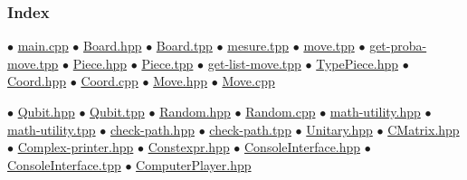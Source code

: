 
\begin{frame}
\frametitle{{Index}}
$\bullet$ \hyperlink{main.cpp}{main.cpp}\newline
$\bullet$ \hyperlink{Board.hpp}{Board.hpp}\newline
$\bullet$ \hyperlink{Board.tpp}{Board.tpp}\newline
$\bullet$ \hyperlink{mesure.tpp}{mesure.tpp}\newline
$\bullet$ \hyperlink{move.tpp}{move.tpp}\newline
$\bullet$ \hyperlink{getprobamove.tpp}{get-proba-move.tpp}\newline
$\bullet$ \hyperlink{Piece.hpp}{Piece.hpp}\newline
$\bullet$ \hyperlink{Piece.tpp}{Piece.tpp}\newline
$\bullet$ \hyperlink{getlistmove.tpp}{get-list-move.tpp}\newline
$\bullet$ \hyperlink{TypePiece.hpp}{TypePiece.hpp}\newline
$\bullet$ \hyperlink{Coord.hpp}{Coord.hpp}\newline
$\bullet$ \hyperlink{Coord.cpp}{Coord.cpp}\newline
$\bullet$ \hyperlink{Move.hpp}{Move.hpp}\newline
$\bullet$ \hyperlink{Move.cpp}{Move.cpp}\newline

\end{frame}
\begin{frame}
$\bullet$ \hyperlink{Qubit.hpp}{Qubit.hpp}\newline
$\bullet$ \hyperlink{Qubit.tpp}{Qubit.tpp}\newline
$\bullet$ \hyperlink{Random.hpp}{Random.hpp}\newline
$\bullet$ \hyperlink{Random.cpp}{Random.cpp}\newline
$\bullet$ \hyperlink{mathutility.hpp}{math-utility.hpp}\newline
$\bullet$ \hyperlink{mathutility.tpp}{math-utility.tpp}\newline
$\bullet$ \hyperlink{checkpath.hpp}{check-path.hpp}\newline
$\bullet$ \hyperlink{checkpath.tpp}{check-path.tpp}\newline
$\bullet$ \hyperlink{Unitary.hpp}{Unitary.hpp}\newline
$\bullet$ \hyperlink{CMatrix.hpp}{CMatrix.hpp}\newline
$\bullet$ \hyperlink{Complexprinter.hpp}{Complex-printer.hpp}\newline
$\bullet$ \hyperlink{Constexpr.hpp}{Constexpr.hpp}\newline
$\bullet$ \hyperlink{ConsoleInterface.hpp}{ConsoleInterface.hpp}\newline
$\bullet$ \hyperlink{ConsoleInterface.tpp}{ConsoleInterface.tpp}\newline
$\bullet$ \hyperlink{ComputerPlayer.hpp}{ComputerPlayer.hpp}\newline

\end{frame}
